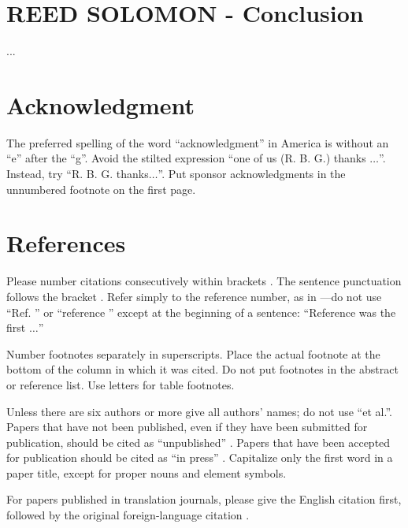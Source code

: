 \documentclass[conference]{IEEEtran}
\begin{document}
\section{REED SOLOMON - Conclusion}
...

\section*{Acknowledgment}

The preferred spelling of the word ``acknowledgment'' in America is without 
an ``e'' after the ``g''. Avoid the stilted expression ``one of us (R. B. 
G.) thanks $\ldots$''. Instead, try ``R. B. G. thanks$\ldots$''. Put sponsor 
acknowledgments in the unnumbered footnote on the first page.

\section*{References}

Please number citations consecutively within brackets \cite{b1}. The 
sentence punctuation follows the bracket \cite{b2}. Refer simply to the reference 
number, as in \cite{b3}---do not use ``Ref. \cite{b3}'' or ``reference \cite{b3}'' except at 
the beginning of a sentence: ``Reference \cite{b3} was the first $\ldots$''

Number footnotes separately in superscripts. Place the actual footnote at 
the bottom of the column in which it was cited. Do not put footnotes in the 
abstract or reference list. Use letters for table footnotes.

Unless there are six authors or more give all authors' names; do not use 
``et al.''. Papers that have not been published, even if they have been 
submitted for publication, should be cited as ``unpublished'' \cite{b4}. Papers 
that have been accepted for publication should be cited as ``in press'' \cite{b5}. 
Capitalize only the first word in a paper title, except for proper nouns and 
element symbols.

For papers published in translation journals, please give the English 
citation first, followed by the original foreign-language citation \cite{b6}.
\end{document}
